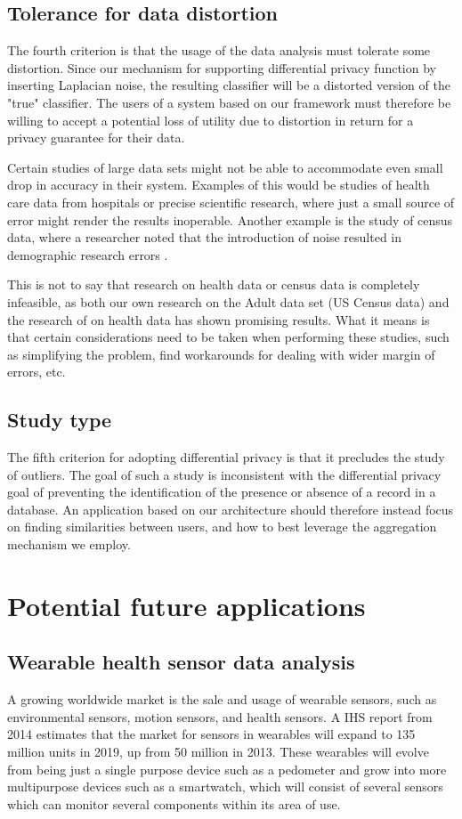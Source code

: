 \subsection{Tolerance for data distortion}
The fourth criterion is that the usage of the data analysis must tolerate some distortion. Since our mechanism for supporting differential privacy function by inserting Laplacian noise, the resulting classifier will be a distorted version of the "true" classifier. The users of a system based on our framework must therefore be willing to accept a potential loss of utility due to distortion in return for a privacy guarantee for their data. 

Certain studies of large data sets might not be able to accommodate even small drop in accuracy in their system. Examples of this would be studies of health care data from hospitals or precise scientific research, where just a small source of error might render the results inoperable. Another example is the study of census data, where a researcher noted that the introduction of noise resulted in demographic research errors \citep{yakowitz2011tragedy}. 

This is not to say that research on health data or census data is completely infeasible, as both our own research on the Adult data set (US Census data) and the research of \cite{ji2014DisLogReg} on health data has shown promising results. What it means is that certain considerations need to be taken when performing these studies, such as simplifying the problem, find workarounds for dealing with wider margin of errors, etc. 

\subsection{Study type}
The fifth criterion for adopting differential privacy is that it precludes the study of outliers. The goal of such a study is inconsistent with the differential privacy goal of preventing the identification of the presence or absence of a record in a database. An application based on our architecture should therefore instead focus on finding similarities between users, and how to best leverage the aggregation mechanism we employ. 


\section{Potential future applications}
\subsection{Wearable health sensor data analysis }
A growing worldwide market is the sale and usage of wearable sensors, such as environmental sensors, motion sensors, and health sensors. A IHS report \citep{ihs2014reportwearables} from 2014 estimates that the market for sensors in wearables will expand to 135 million units in 2019, up from 50 million in 2013. These wearables will evolve from being just a single purpose device such as a pedometer and grow into more multipurpose devices such as a smartwatch, which will consist of several sensors which can monitor several components within its area of use. 

